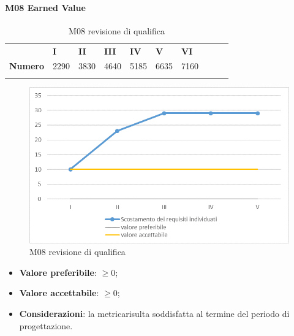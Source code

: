 \paragraph{M08 Earned Value} \mbox{}
\begin{longtable}[H!] {						
		>{}p{50mm}  		
		>{}p{8mm}
		>{}p{8mm}		
		>{}p{8mm}		
		>{}p{8mm}		
		>{}p{8mm}		
		>{}p{8mm}
		>{}p{8mm}
		>{}p{8mm}
		>{}p{8mm}
	}
	\rowcolor{gray!50}
	\textbf{} & \textbf{I} & \textbf{II} & \textbf{III} & \textbf{IV} & \textbf{V} & \textbf{VI} \TBstrut \\ [2mm]
	\textbf{Numero} & 2290 & 3830 & 4640 & 5185 & 6635 & 7160 \TBstrut \\ [2mm]
	\rowcolor{white}
	\caption{M08 revisione di qualifica}
\end{longtable}
\begin{figure}[H] 	
	\includegraphics[width=\linewidth]{./img/grafici/RP1.png}	
	\caption{M08 revisione di qualifica}	
\end{figure}
\begin{itemize}
	\item \textbf{Valore preferibile}: $\ge0$;
	\item \textbf{Valore accettabile}: $\ge0$;
	\item \textbf{Considerazioni}: la metrica\glosp risulta soddisfatta al termine del periodo di progettazione\glo.
\end{itemize}

